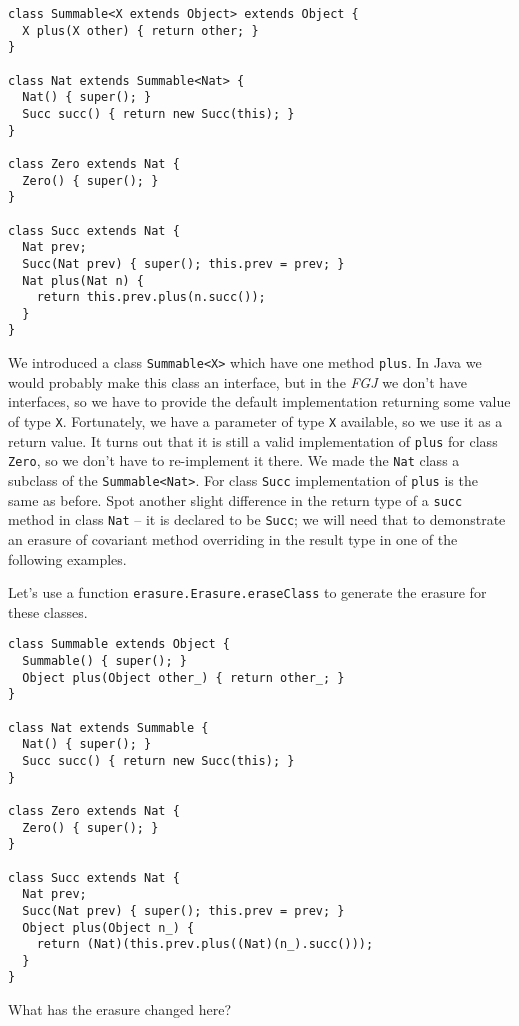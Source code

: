 \documentclass{article}[12pt]
\begin{document}
\begin{verbatim}
class Summable<X extends Object> extends Object {
  X plus(X other) { return other; }
}

class Nat extends Summable<Nat> {
  Nat() { super(); }
  Succ succ() { return new Succ(this); }
}

class Zero extends Nat { 
  Zero() { super(); }
}

class Succ extends Nat {
  Nat prev;
  Succ(Nat prev) { super(); this.prev = prev; }
  Nat plus(Nat n) {
    return this.prev.plus(n.succ());
  }
}
\end{verbatim}
We introduced a class \texttt{Summable<X>} which have one method
\texttt{plus}. In Java we would probably make this class an
interface, but in the \emph{FGJ} we don't have interfaces, so we have
to provide the default implementation returning some value of type
\texttt{X}. Fortunately, we have a parameter of type \texttt{X}
available, so we use it as a return value. It turns out that it
is still a valid implementation of \texttt{plus} for class
\texttt{Zero}, so we don't have to re-implement it there. We made
the \texttt{Nat} class a subclass of the \texttt{Summable<Nat>}.
For class \texttt{Succ} implementation of \texttt{plus} is the same
as before. Spot another slight difference in the return type
of a \texttt{succ} method in class \texttt{Nat} -- it is
declared to be \texttt{Succ}; we will need that to demonstrate
an erasure of covariant method overriding in the result type in
one of the following examples.

Let's use a function \texttt{erasure.Erasure.eraseClass} to generate
the erasure for these classes.

\begin{verbatim}
class Summable extends Object {
  Summable() { super(); }
  Object plus(Object other_) { return other_; }
}

class Nat extends Summable {
  Nat() { super(); }
  Succ succ() { return new Succ(this); }
}

class Zero extends Nat { 
  Zero() { super(); }
}

class Succ extends Nat {
  Nat prev;
  Succ(Nat prev) { super(); this.prev = prev; }
  Object plus(Object n_) {
    return (Nat)(this.prev.plus((Nat)(n_).succ())); 
  }
}
\end{verbatim}
What has the erasure changed here?
\end{document}
